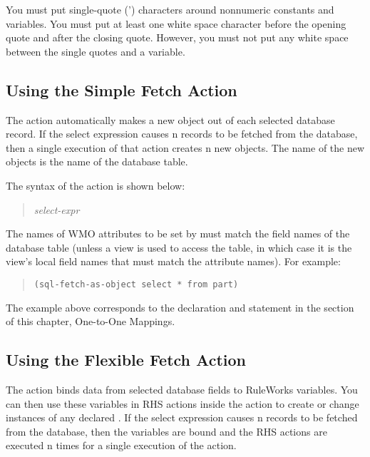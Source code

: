\begin{note}
  You must put single-quote (\co') characters around nonnumeric
  constants and variables. You must put at least one white space
  character before the opening quote and after the closing
  quote. However, you must not put any white space between the single
  quotes and a variable.
\end{note}

\subsection{Using the Simple Fetch Action}

The  action automatically makes a new object
out of each selected database record. If the select expression causes
n records to be fetched from the database, then a single execution of
that  action creates n new objects. The
 name of the new objects is the name of the database
table.

The syntax of the  action is shown below:

\begin{quote}
 \it{select-expr}
\end{quote}

The names of WMO attributes to be set by  must
match the field names of the database table (unless a view is used to
access the table, in which case it is the view's local field names
that must match the  attribute names). For example:

\begin{quote}
\begin{verbatim}
(sql-fetch-as-object select * from part)
\end{verbatim}
\end{quote}

The example above corresponds to the  declaration and
 statement in the section of this chapter, One-to-One
Mappings.

\subsection{Using the Flexible Fetch Action}

The  action binds data from selected database fields to
RuleWorks variables. You can then use these variables in RHS actions
inside the  action to create or change instances of any
declared .  If the select expression causes n records to
be fetched from the database, then the variables are bound and the RHS
actions are executed n times for a single execution of the
 action.

